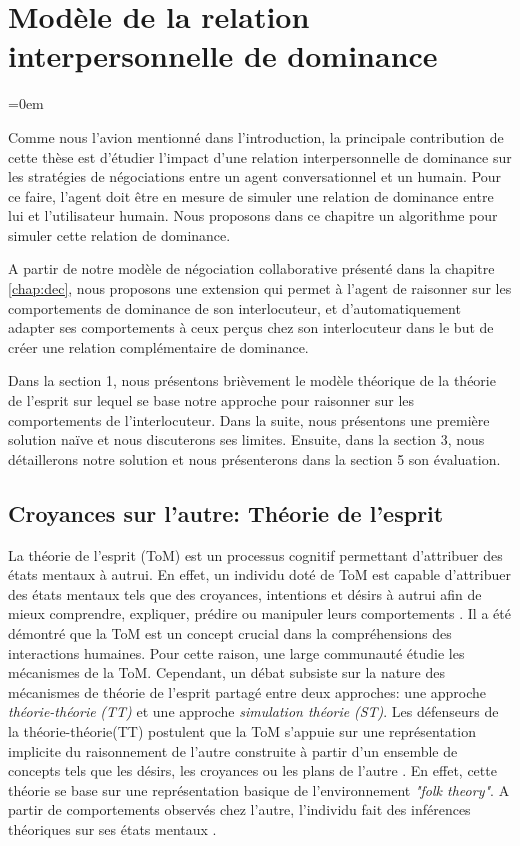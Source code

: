 \chapter[Relation interpersonnelle de dominance]{Modèle de la relation interpersonnelle de dominance}
\label{chap:Tom}
\begingroup
\parindent=0em
\localtableofcontents 
\clearpage
\endgroup

Comme nous l'avion mentionné dans l'introduction, la principale contribution de cette thèse est d'étudier l'impact d'une relation interpersonnelle de dominance sur les stratégies de négociations entre un agent conversationnel et un humain. 
Pour ce faire, l'agent doit être en mesure de simuler une relation de dominance entre lui et l'utilisateur humain. Nous proposons dans ce chapitre un algorithme pour simuler cette relation de dominance. 

A partir de notre modèle de négociation collaborative présenté dans la chapitre \ref{chap:dec}, nous proposons une extension qui permet à l'agent de raisonner sur les comportements de dominance de son interlocuteur, et d'automatiquement adapter ses comportements à ceux perçus chez son interlocuteur dans le but de créer une relation complémentaire de dominance.

Dans la section 1, nous présentons brièvement le modèle théorique de la théorie de l'esprit sur lequel se base notre approche pour raisonner sur les comportements de l'interlocuteur. Dans la suite, nous présentons une première solution naïve et nous discuterons ses limites. Ensuite, dans la section 3, nous détaillerons notre solution et nous présenterons dans la section 5 son évaluation.  




\section{Croyances sur l'autre: Théorie de l'esprit}
La théorie de l'esprit (ToM) est un processus cognitif permettant d'attribuer des états mentaux à autrui. En effet, un individu doté de ToM est capable d'attribuer
des états mentaux tels que des croyances, intentions et désirs à autrui afin de mieux comprendre, expliquer, prédire ou manipuler leurs comportements  \cite{harbers2012modeling}. Il a été démontré que la ToM est un concept crucial dans la compréhensions des interactions humaines. Pour cette raison, une large communauté étudie les mécanismes de la ToM. Cependant, un débat subsiste sur la nature des mécanismes de théorie de l’esprit partagé entre deux approches: une approche \textit{théorie-théorie}  \emph{(TT)} et une approche \textit{simulation théorie} \emph{(ST)}.
Les défenseurs de la théorie-théorie(TT) postulent que la ToM s’appuie sur une représentation implicite du raisonnement de l'autre construite à partir d'un ensemble de concepts tels que les désirs, les croyances ou les plans de l'autre \cite{harbers2012modeling}. En effet, cette théorie se base sur une représentation basique de l'environnement \emph{"folk theory"}. A partir de comportements observés chez l'autre, l'individu fait des inférences théoriques sur ses états mentaux \cite{shanton2010simulation}.

